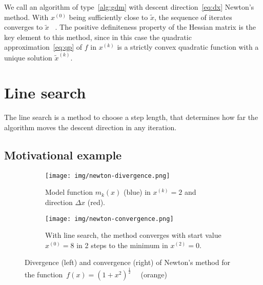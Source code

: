 We call an algorithm of type~\eqref{alg:gdm} with descent direction~\eqref{eq:dx} Newton's method. With $x^{(0)}$ being sufficiently close to $\tilde{x}$, the sequence of iterates converges to $\tilde{x}$ ~\cite[Thm 3.5]{NW}.
The positive definiteness property of the Hessian matrix is the key element to this method, since in this case the quadratic approximation~\eqref{eq:qp} of $f$ in $x^{(k)}$ is a strictly convex quadratic function with a unique solution $ \tilde{x}^{(k)}$.

\section{Line search}\label{sec:linesearch}

The line search is a method to choose a step length, that determines how far the algorithm moves the descent direction in any iteration.

\subsection{Motivational example}

\begin{figure}
	\centering
	\begin{subfigure}{0.49\textwidth}
		\centering
		\texttt{[image: img/newton-divergence.png]}
		\caption{Model function $m_k(x)$ (blue) in $x^{(k)} = 2$ and direction $\Delta x$ (red).}
		\label{fig:newton:divergence}
	\end{subfigure}
	\begin{subfigure}{0.49\textwidth}
		\centering
		\texttt{[image: img/newton-convergence.png]}
		\caption{With line search, the method converges with start value $x^{(0)} = 8$ in 2 steps to the minimum in $x^{(2)}=0$.}
		\label{fig:newton:convergence}
	\end{subfigure}
	\caption{Divergence (left) and convergence (right) of Newton's method for the function~$f(x) = (1 + x^2)^{\frac{1}{2}} \quad$ (orange) }
	\label{fig:newton:conv-div}
\end{figure}

